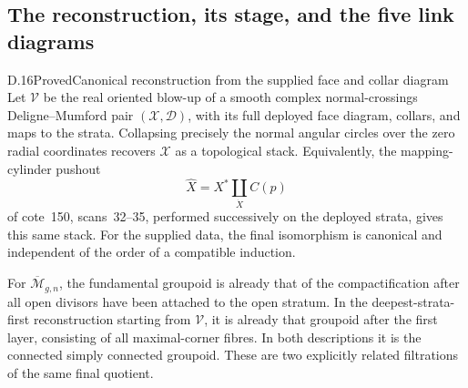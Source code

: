 \subsection{The reconstruction, its stage, and the five link diagrams}

\begin{result}{D.16}{Proved}{Canonical reconstruction from the supplied face and collar diagram}
Let $\mathcal V$ be the real oriented blow-up of a smooth complex normal-crossings Deligne--Mumford pair $(\mathcal X,\mathcal D)$, with its full deployed face diagram, collars, and maps to the strata. Collapsing precisely the normal angular circles over the zero radial coordinates recovers $\mathcal X$ as a topological stack. Equivalently, the mapping-cylinder pushout
\[
 \widehat X=X^*\mathop{\amalg}_{\dot X} C(p)
\]
of cote~150, scans~32--35, performed successively on the deployed strata, gives this same stack. For the supplied data, the final isomorphism is canonical and independent of the order of a compatible induction.

For $\overline{\mathcal M}_{g,n}$, the fundamental groupoid is already that of the compactification after all open divisors have been attached to the open stratum. In the deepest-strata-first reconstruction starting from $\mathcal V$, it is already that groupoid after the first layer, consisting of all maximal-corner fibres. In both descriptions it is the connected simply connected groupoid. These are two explicitly related filtrations of the same final quotient.
\end{result}
